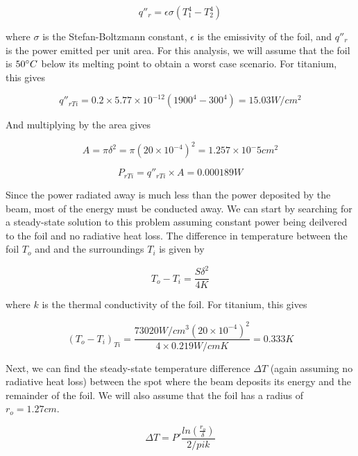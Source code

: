 \documentclass[12pt]{article}
\begin{document}
\begin{equation}
q''_r=\epsilon \sigma (T_{1}^{4}-T_{2}^{4})
\end{equation}

where $\sigma$ is the Stefan-Boltzmann constant, $\epsilon$ is the emissivity of the foil, and $q''_r$ is the power emitted per unit area. For this analysis, we will assume that the foil is $50 \degree C$ below its melting point to obtain a worst case scenario. For titanium, this gives

\begin{equation}
q''_{r Ti}=0.2 \times 5.77 \times 10^{-12} (1900^{4}-300^{4})=15.03 W/cm^2
\end{equation}

And multiplying by the area gives

\begin{equation}
A=\pi \delta^{2}=\pi (20 \times 10^{-4})^2=1.257 \times 10^-5 cm^2
\end{equation}

\begin{equation}
P_{r Ti}=q''_{r Ti} \times A=0.000189 W
\end{equation}

Since the power radiated away is much less than the power deposited by the beam, most of the energy must be conducted away. We can start by searching for a steady-state solution to this problem assuming constant power being deilvered to the foil and no radiative heat loss. The difference in temperature between the foil $T_o$ and and the surroundings $T_i$ is given by

\begin{equation}
T_o-T_i=\frac{S \delta^{2}}{4 K}
\end{equation}

where $k$ is the thermal conductivity of the foil. For titanium, this gives

\begin{equation}
(T_o-T_i)_{Ti}=\frac{73020 W/cm^3 (20 \times 10^{-4})^{2}}{4 \times 0.219 W/cm K}=0.333 K
\end{equation}

Next, we can find the steady-state temperature difference $\Delta T$ (again assuming no radiative heat loss) between the spot where the beam deposits its energy and the remainder of the foil. We will also assume that the foil has a radius of $r_o=1.27 cm$. 

\begin{equation}
\Delta T=P' \frac{ln(\frac{r_o}{\delta})}{2 /pi k}
\end{equation}
\end{document}
